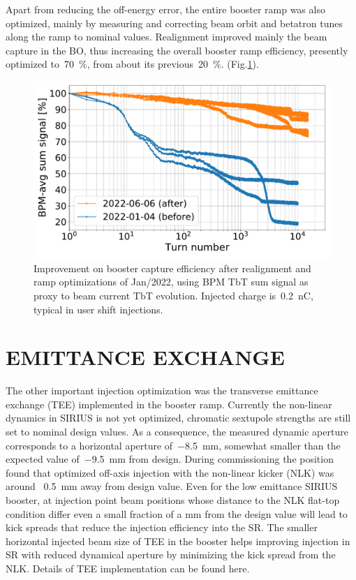 \documentclass[a4paper,
               keeplastbox,   %
               ]{jacow}
\begin{document}
Apart from reducing the off-energy error, the entire booster ramp was also optimized, mainly by measuring and correcting beam orbit and betatron tunes along the ramp to nominal values. Realignment improved mainly the beam capture in the BO, thus increasing the overall booster ramp efficiency, presently optimized to~\SI{70}{\percent}, from about its previous~\SI{20}{\percent}.  (Fig.\ref{fig:bo-ramp}).
\begin{figure}[!htb]
   \centering
   \includegraphics*[width=.9\columnwidth]{THPOPT038_f2.pdf}
   \caption{Improvement on booster capture efficiency after realignment and ramp optimizations of Jan/2022, using BPM TbT sum signal as proxy to beam current TbT evolution. Injected charge is~\SI{0.2}{\nano\coulomb}, typical in user shift injections.}
   \label{fig:bo-ramp}
\end{figure}


\section{EMITTANCE EXCHANGE}

The other important injection optimization was the transverse emittance exchange (TEE) implemented in the booster ramp. Currently the non-linear dynamics in SIRIUS is not yet optimized, chromatic sextupole strengths are still set to nominal design values. As a consequence, the measured dynamic aperture corresponds to a horizontal aperture of~\SI{-8.5}{\milli\meter}, somewhat smaller than the expected value of~\SI{-9.5}{\milli\meter} from design. During commissioning the position found that optimized off-axis injection with the non-linear kicker (NLK) was around ~\SI{0.5}{\milli\meter} away from design value. Even for the low emittance SIRIUS booster, at injection point beam positions whose distance to the NLK flat-top condition differ even a small fraction of a mm from the design value will lead to kick spreads that reduce the injection efficiency into the SR. The smaller horizontal injected beam size of TEE in the booster helps improving injection in SR with reduced dynamical aperture by minimizing the kick spread from the NLK. Details of TEE implementation can be found here\cite{quentino:IPAC22}.
\end{document}
